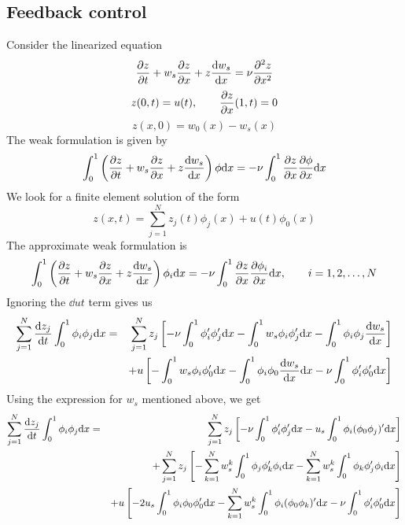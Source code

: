 \documentclass[12pt]{article}
\begin{document}
\subsection{Feedback control}
Consider the linearized equation
\begin{equation}
\frac{\partial z}{\partial t} + w_s \frac{\partial z}{\partial x} + z \frac{\textrm{d} w_s}{\textrm{d} x} = \nu \frac{\partial ^2 z}{\partial x^2}
\end{equation}
\begin{equation}
z(0,t) = u(t), \qquad \frac{\partial z}{\partial x}(1,t) = 0
\end{equation}
\begin{equation}
z(x,0) = w_0(x) - w_s(x)
\end{equation}
The weak formulation is given by
\begin{equation*}
\int_0^1 \left( \frac{\partial z}{\partial t} + w_s \frac{\partial z}{\partial x} + z \frac{\textrm{d} w_s}{\textrm{d} x} \right) \phi \textrm{d} x = - \nu \int_0^1 \frac{\partial z}{\partial x} \frac{\partial \phi}{\partial x} \textrm{d} x
\end{equation*}
We look for a finite element solution of the form
\[
z(x,t) = \sum_{j=1}^N z_j(t) \phi_j(x) + u(t) \phi_0(x)
\]
The approximate weak formulation is 
\begin{equation*}
\int_0^1 \left( \frac{\partial z}{\partial t} + w_s \frac{\partial z}{\partial x} + z \frac{\textrm{d} w_s}{\textrm{d} x} \right) \phi_i \textrm{d} x = - \nu \int_0^1 \frac{\partial z}{\partial x} \frac{\partial \phi_i}{\partial x} \textrm{d} x, \qquad i=1,2,\ldots,N
\end{equation*}
Ignoring the $\dd{u}{t}$ term gives us
\begin{eqnarray*}
\sum_{j=1}^N \frac{\textrm{d} z_j}{\textrm{d} t} \int_0^1 \phi_i \phi_j \textrm{d} x &=&
\sum_{j=1}^N z_j \left[ -\nu \int_0^1 \phi_i' \phi_j' \textrm{d} x - \int_0^1 w_s \phi_i \phi_j' \textrm{d} x - \int_0^1 \phi_i \phi_j \frac{\textrm{d} w_s}{\textrm{d} x} \right] \\
&& + u \left[ - \int_0^1 w_s \phi_i \phi_0' \textrm{d} x - \int_0^1 \phi_i \phi_0 \frac{\textrm{d} w_s}{\textrm{d} x} \textrm{d} x  - \nu \int_0^1 \phi_i' \phi_0' \textrm{d} x \right ]
\end{eqnarray*}
Using the expression for $w_s$ mentioned above, we get
\begin{eqnarray*}
\sum_{j=1}^N \frac{\textrm{d} z_j}{\textrm{d} t} \int_0^1 \phi_i \phi_j \textrm{d} x &=&
\sum_{j=1}^N z_j \left[ -\nu \int_0^1 \phi_i' \phi_j' \textrm{d} x - u_s \int_0^1 \phi_i (\phi_0 \phi_j)' \textrm{d} x\right] \\
&& + \sum_{j=1}^N z_j \left[ - \sum_{k=1}^N  w_s^k\int_0^1 \phi_j \phi_k' \phi_i \textrm{d} x - \sum_{k=1}^N  w_s^k\int_0^1 \phi_k \phi_j' \phi_i \textrm{d} x\right ] \\
&& + u \left[ - 2 u_s \int_0^1 \phi_i \phi_0 \phi_0' \textrm{d} x  - \sum_{k=1}^N w_s^k \int_0^1 \phi_i (\phi_0 \phi_k)' \textrm{d} x  - \nu \int_0^1 \phi_i' \phi_0' \textrm{d} x \right ]
\end{eqnarray*}
\end{document}
